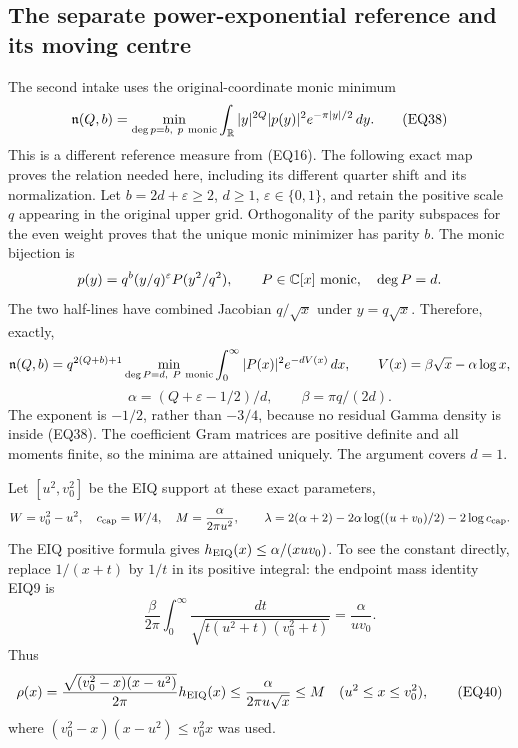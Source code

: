 \documentclass[11pt,a4paper]{article}
\begin{document}
\subsection{The separate power-exponential reference and its moving centre}
\label{eqreview:powerexponential}

The second intake uses the original-coordinate monic minimum
\[
 {\mathfrak n}(Q,b)=
 \min_{\deg p=b,\ p\ {\rm monic}}
 \int_{\mathbb R}|y|^{2Q}|p(y)|^2e^{-\pi|y|/2}\,dy.
\tag{EQ38}
\]
This is a different reference measure from (EQ16).  The following exact
map proves the relation needed here, including its different quarter
shift and its normalization.  Let \(b=2d+\varepsilon\ge2\),
\(d\ge1\), \(\varepsilon\in\{0,1\}\), and retain the positive scale
\(q\) appearing in the original upper grid.  Orthogonality of the parity
subspaces for the even weight proves that the unique monic minimizer
has parity \(b\).  The monic bijection is
\[
 p(y)=q^b(y/q)^\varepsilon P(y^2/q^2),\qquad
 P\in\mathbb C[x]\ {\rm monic},\quad\deg P=d.
\]
The two half-lines have combined Jacobian \(q/\sqrt x\) under
\(y=q\sqrt x\).  Therefore, exactly,
\[
 {\mathfrak n}(Q,b)
 =q^{2(Q+b)+1}
 \min_{\deg P=d,\ P\ {\rm monic}}
 \int_0^\infty |P(x)|^2e^{-dV(x)}\,dx,\qquad
 V(x)=\beta\sqrt x-\alpha\log x,
\]
\[
 \alpha=(Q+\varepsilon-1/2)/d,\qquad
 \beta=\pi q/(2d).
\tag{EQ39}
\]
The exponent is \(-1/2\), rather than \(-3/4\), because no residual
Gamma density is inside (EQ38).  The coefficient Gram matrices are
positive definite and all moments finite, so the minima are attained
uniquely.  The argument covers \(d=1\).

Let \([u^2,v_0^2]\) be the EIQ support at these exact parameters,
\[
 W=v_0^2-u^2,\quad c_{\rm cap}=W/4,\quad
 M=\frac{\alpha}{2\pi u^2},\qquad
 \lambda=2(\alpha+2)-2\alpha\log((u+v_0)/2)-2\log c_{\rm cap}.
\]
The EIQ positive formula gives
\(h_{\rm EIQ}(x)\le\alpha/(xuv_0)\).  To see the constant directly,
replace \(1/(x+t)\) by \(1/t\) in its positive integral:
the endpoint mass identity EIQ9 is
\[
 \frac{\beta}{2\pi}\int_0^\infty
       \frac{dt}{\sqrt{t(u^2+t)(v_0^2+t)}}=\frac{\alpha}{uv_0}.
\]
Thus
\[
 \rho(x)=\frac{\sqrt{(v_0^2-x)(x-u^2)}}{2\pi}h_{\rm EIQ}(x)
 \le \frac{\alpha}{2\pi u\sqrt x}
 \le M\quad (u^2\le x\le v_0^2),
\tag{EQ40}
\]
where \((v_0^2-x)(x-u^2)\le v_0^2x\) was used.
\end{document}
